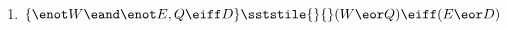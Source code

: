 \begin{enumerate}[label=(\arabic*)]
\item $\{\enot W \eand \enot E, Q \eiff D\} \sststile{}{} (W \eor Q) \eiff (E \eor D)$

%
\end{enumerate}

